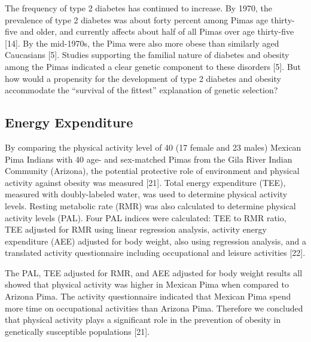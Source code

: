 \documentclass[12pt]{article}
\begin{document}
The frequency of type 2 diabetes has continued to increase. By 1970, the prevalence of type 2 diabetes was about forty percent among Pimas age thirty-five and older, and currently affects about half of all Pimas over age thirty-five [14]. By the mid-1970s, the Pima were also more obese than similarly aged Caucasians [5]. Studies supporting the familial nature of diabetes and obesity among the Pimas indicated a clear genetic component to these disorders [5]. But how would a propensity for the development of type 2 diabetes and obesity accommodate the “survival of the fittest” explanation of genetic selection?

\subsection{Energy Expenditure}
By comparing the physical activity level of 40 (17 female and 23 males) Mexican Pima Indians with 40 age- and sex-matched Pimas from the Gila River Indian Community (Arizona), the potential protective role of environment and physical activity against obesity was measured [21]. Total energy expenditure (TEE), measured with doubly-labeled water, was used to determine physical activity levels. Resting metabolic rate (RMR) was also calculated to determine physical activity levels (PAL). Four PAL indices were calculated: TEE to RMR ratio, TEE adjusted for RMR using linear regression analysis, activity energy expenditure (AEE) adjusted for body weight, also using regression analysis, and a translated activity questionnaire including occupational and leisure activities [22].

The PAL, TEE adjusted for RMR, and AEE adjusted for body weight results all showed that physical activity was higher in Mexican Pima when compared to Arizona Pima. The activity questionnaire indicated that Mexican Pima spend more time on occupational activities than Arizona Pima. Therefore we concluded that physical activity plays a significant role in the prevention of obesity in genetically susceptible populations [21].
\end{document}
